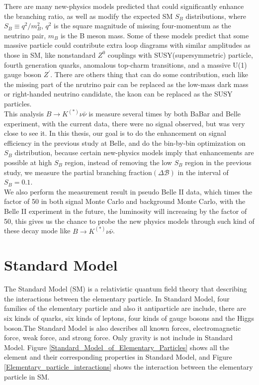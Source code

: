 There are many new-physics models predicted that could significantly enhance the branching ratio, as well as modify the expected SM $S_B$ distributions, where $S_B \equiv q^2/m^2_B$, $q^2$ is the square magnitude of missing four-momentum as the neutrino pair, $m_B$ is the B meson mass. Some of these models predict that some massive particle could contribute extra loop diagrams with similar amplitudes as those in SM, like nonstandard $Z^0$ couplings with SUSY(supersymmetric) particle, fourth generation quarks, anomalous top-charm transitions, and a massive U(1) gauge boson $Z^{'}$. There are others thing that can do some contribution, such like the missing part of the nrutrino pair can be replaced as the low-mass dark mass or right-handed neutrino candidate, the kaon can be replaced as the SUSY particles.\\
This analysis $B \rightarrow K^{(*)} \nu \bar{\nu}$ is measure several times by both BaBar and Belle experiment, with the current data, there were no signal observed, but was very close to see it. In this thesis, our goal is to do the enhancement on signal efficiency in the previous study at Belle\cite{ref:Lutz2013}, and do the bin-by-bin optimization on $S_B$ distribution, because certain new-physics models imply that enhancements are possible at high $S_B$ region, instead of removing the low $S_B$ region in the previous study, we measure the partial branching fraction$(\Delta \mathcal{B})$ in the interval of $S_B = 0.1$.\\
We also perform the measurement result in pseudo Belle II data, which times the factor of 50 in both signal Monte Carlo and background Monte Carlo, with the Belle II experiment in the future, the luminosity will increasing by the factor of 50, this gives us the chance to probe the new physics models through such kind of these decay mode like $B \rightarrow K^{(*)} \nu \bar{\nu}$.

\section{Standard Model}
The Standard Model (SM) is a relativistic quantum field theory that describing the interactions between the elementary particle. In Standard Model, four families of the elementary particle and also it antiparticle are include, there are six kinds of quarks, six kinds of leptons, four kinds of gauge bosons and the Higgs boson.The Standard Model is also describes all known forces, electromagnetic force, weak force, and strong force. Only gravity is not include in Standard Model. Figure \ref{Standard_Model_of_Elementary_Particles} shows all the element and their corresponding properties in Standard Model, and Figure \ref{Elementary_particle_interactions} shows the interaction between the elementary particle in SM.\\

